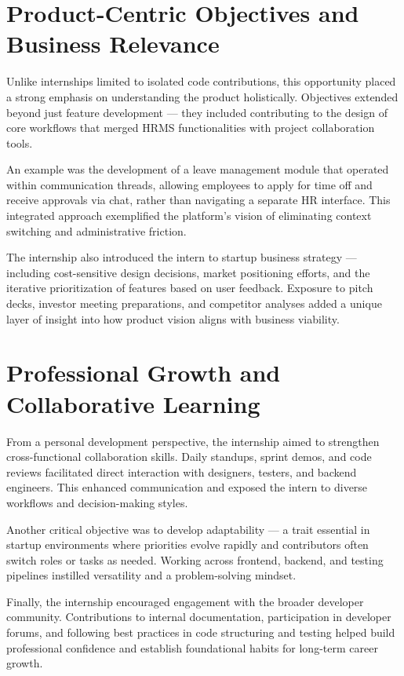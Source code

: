\section{Product-Centric Objectives and Business Relevance}

Unlike internships limited to isolated code contributions, this opportunity placed a strong emphasis on understanding the product holistically. Objectives extended beyond just feature development — they included contributing to the design of core workflows that merged HRMS functionalities with project collaboration tools.

An example was the development of a leave management module that operated within communication threads, allowing employees to apply for time off and receive approvals via chat, rather than navigating a separate HR interface. This integrated approach exemplified the platform's vision of eliminating context switching and administrative friction.

The internship also introduced the intern to startup business strategy — including cost-sensitive design decisions, market positioning efforts, and the iterative prioritization of features based on user feedback. Exposure to pitch decks, investor meeting preparations, and competitor analyses added a unique layer of insight into how product vision aligns with business viability.

\section{Professional Growth and Collaborative Learning}

From a personal development perspective, the internship aimed to strengthen cross-functional collaboration skills. Daily standups, sprint demos, and code reviews facilitated direct interaction with designers, testers, and backend engineers. This enhanced communication and exposed the intern to diverse workflows and decision-making styles.

Another critical objective was to develop adaptability — a trait essential in startup environments where priorities evolve rapidly and contributors often switch roles or tasks as needed. Working across frontend, backend, and testing pipelines instilled versatility and a problem-solving mindset.

Finally, the internship encouraged engagement with the broader developer community. Contributions to internal documentation, participation in developer forums, and following best practices in code structuring and testing helped build professional confidence and establish foundational habits for long-term career growth.

